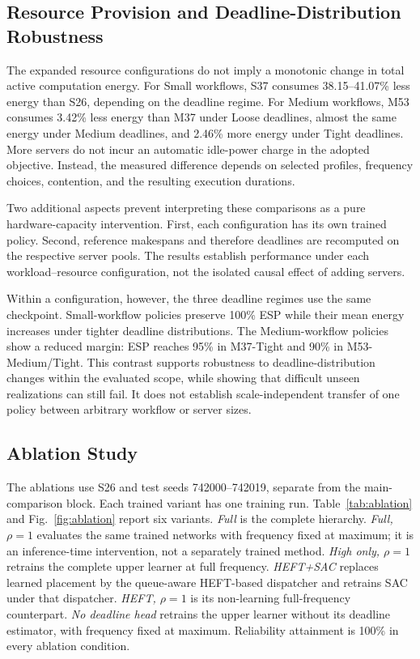 \subsection{Resource Provision and Deadline-Distribution Robustness}
\label{subsec:resource_robustness}

The expanded resource configurations do not imply a monotonic change
in total active computation energy. For Small workflows, S37 consumes
38.15--41.07\% less energy than S26, depending on the deadline regime.
For Medium workflows, M53 consumes 3.42\% less energy than M37 under
Loose deadlines, almost the same energy under Medium deadlines, and
2.46\% more energy under Tight deadlines. More servers do not incur
an automatic idle-power charge in the adopted objective. Instead,
the measured difference depends on selected profiles, frequency
choices, contention, and the resulting execution durations.

Two additional aspects prevent interpreting these comparisons as a
pure hardware-capacity intervention. First, each configuration has
its own trained policy. Second, reference makespans and therefore
deadlines are recomputed on the respective server pools. The
results establish performance under each workload--resource
configuration, not the isolated causal effect of adding servers.

Within a configuration, however, the three deadline regimes use the
same checkpoint. Small-workflow policies preserve 100\% ESP while
their mean energy increases under tighter deadline distributions.
The Medium-workflow policies show a reduced margin: ESP reaches
95\% in M37-Tight and 90\% in M53-Medium/Tight. This contrast
supports robustness to deadline-distribution changes within the
evaluated scope, while showing that difficult unseen realizations
can still fail. It does not establish scale-independent transfer
of one policy between arbitrary workflow or server sizes.

\subsection{Ablation Study}
\label{subsec:ablation}

The ablations use S26 and test seeds 742000--742019, separate from
the main-comparison block. Each trained variant has one training run.
Table~\ref{tab:ablation} and Fig.~\ref{fig:ablation} report six variants.
\emph{Full} is the complete hierarchy. \emph{Full, $\rho=1$} evaluates
the same trained networks with frequency fixed at maximum; it is
an inference-time intervention, not a separately trained method.
\emph{High only, $\rho=1$} retrains the complete upper learner at
full frequency. \emph{HEFT+SAC} replaces learned placement by the
queue-aware HEFT-based dispatcher and retrains SAC under that dispatcher.
\emph{HEFT, $\rho=1$} is its non-learning full-frequency counterpart.
\emph{No deadline head} retrains the upper learner without its
deadline estimator, with frequency fixed at maximum. Reliability
attainment is 100\% in every ablation condition.

